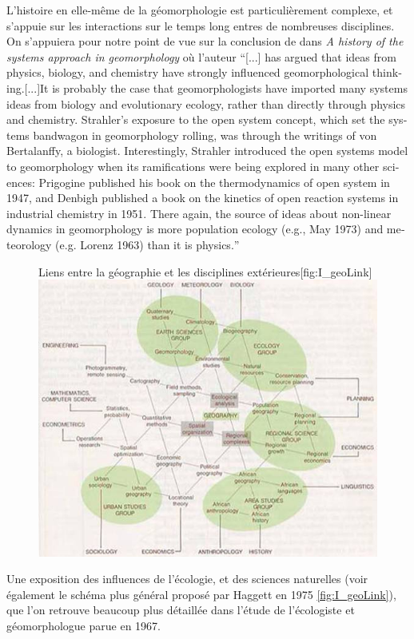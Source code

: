 L'histoire en elle-même de la géomorphologie est particulièrement complexe, et s'appuie sur les interactions sur le temps long entres de nombreuses disciplines. On s'appuiera pour notre point de vue sur la conclusion de \textcite{Huggett2007} dans \textit{A history of the systems approach in geomorphology} où l'auteur \foreignquote{english}{[...] has argued that ideas from physics, biology, and chemistry have strongly influenced geomorphological thinking.[...]It is probably the case that geomorphologists have imported many systems ideas from biology and evolutionary ecology, rather than directly through physics and chemistry. Strahler’s exposure to the open system concept, which set the systems bandwagon in geomorphology rolling, was through the writings of von Bertalanffy, a biologist. Interestingly, Strahler introduced the open systems model to geomorphology when its ramifications were being explored in many other sciences: Prigogine published his book on the thermodynamics of open system in 1947, and Denbigh published a book on the kinetics of open reaction systems in industrial chemistry in 1951. There again, the source of ideas about non-linear dynamics in geomorphology is more population ecology (e.g., May 1973) and meteorology (e.g. Lorenz 1963) than it is physics.}

  \begin{figure}[htbp]
  \begin{sidecaption}[fortoc]{Liens entre la géographie et les disciplines extérieures}[fig:I_geoLink]
    \centering
   \includegraphics[width=.8\linewidth]{haggett1975_p587.jpg}
    \end{sidecaption}
  \end{figure}

Une exposition des influences de l'écologie, et des sciences naturelles (voir également le schéma plus général proposé par Haggett en 1975 \ref{fig:I_geoLink}), que l'on retrouve beaucoup plus détaillée dans l'étude de l'écologiste et géomorphologue \textcite{Stoddart1967} parue en 1967.

